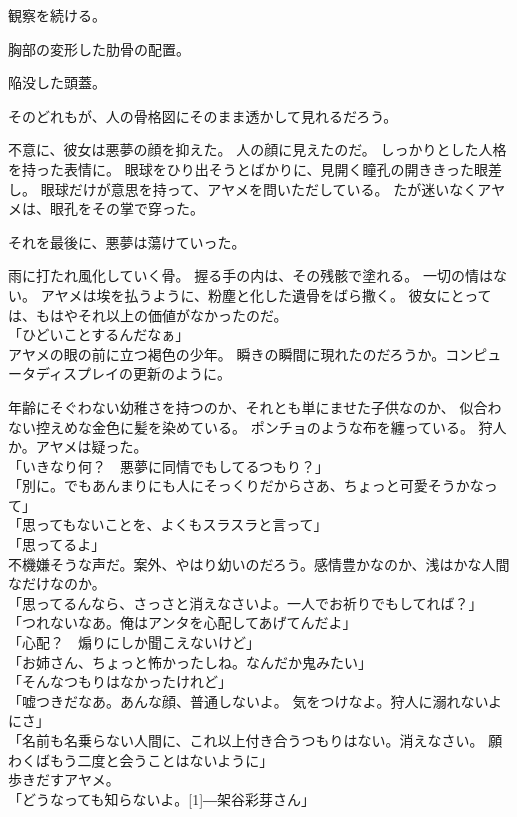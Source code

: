 \documentclass[../IHMain]{subfiles}
\begin{document}
観察を続ける。

胸部の変形した肋骨の配置。

陥没した頭蓋。

そのどれもが、人の骨格図にそのまま透かして見れるだろう。

不意に、彼女は悪夢の顔を抑えた。
人の顔に見えたのだ。
しっかりとした人格を持った表情に。
眼球をひり出そうとばかりに、見開く瞳孔の開ききった眼差し。
眼球だけが意思を持って、アヤメを問いただしている。
たが迷いなくアヤメは、眼孔をその掌で穿った。

それを最後に、悪夢は蕩けていった。

雨に打たれ風化していく骨。
握る手の内は、その残骸で塗れる。
一切の情はない。
アヤメは埃を払うように、粉塵と化した遺骨をばら撒く。
彼女にとっては、もはやそれ以上の価値がなかったのだ。\\

「ひどいことするんだなぁ」\\
アヤメの眼の前に立つ褐色の少年。
瞬きの瞬間に現れたのだろうか。コンピュータディスプレイの更新のように。

年齢にそぐわない幼稚さを持つのか、それとも単にませた子供なのか、
似合わない控えめな金色に髪を染めている。
ポンチョのような布を纏っている。
狩人か。アヤメは疑った。\\
「いきなり何？　悪夢に同情でもしてるつもり？」\\
「別に。でもあんまりにも人にそっくりだからさあ、ちょっと可愛そうかなって」\\
「思ってもないことを、よくもスラスラと言って」\\
「思ってるよ」\\
不機嫌そうな声だ。案外、やはり幼いのだろう。感情豊かなのか、浅はかな人間なだけなのか。\\
「思ってるんなら、さっさと消えなさいよ。一人でお祈りでもしてれば？」\\
「つれないなあ。俺はアンタを心配してあげてんだよ」\\
「心配？　煽りにしか聞こえないけど」\\
「お姉さん、ちょっと怖かったしね。なんだか鬼みたい」\\
「そんなつもりはなかったけれど」\\
「嘘つきだなあ。あんな顔、普通しないよ。
気をつけなよ。狩人に溺れないよにさ」\\
「名前も名乗らない人間に、これ以上付き合うつもりはない。消えなさい。
願わくばもう二度と会うことはないように」\\
歩きだすアヤメ。\\
「どうなっても知らないよ。\scalebox{3}[1]{―}架谷彩芽さん」\\
\end{document}
